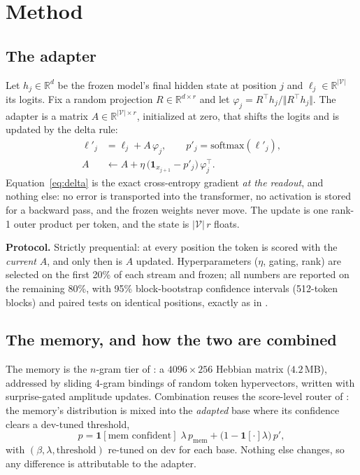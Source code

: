 \documentclass[11pt]{article}
\begin{document}
\section{Method}\label{sec:method}

\subsection{The adapter}

Let $h_j \in \mathbb{R}^{d}$ be the frozen model's final hidden state at position $j$ and $\ell_j \in \mathbb{R}^{|\mathcal{V}|}$ its logits. Fix a random projection $R \in \mathbb{R}^{d \times r}$ and let $\varphi_j = R^{\!\top}h_j / \Vert R^{\!\top}h_j\Vert$. The adapter is a matrix $A \in \mathbb{R}^{|\mathcal{V}| \times r}$, initialized at zero, that shifts the logits and is updated by the delta rule:
\begin{align}
\ell'_j &= \ell_j + A\,\varphi_j, \qquad p'_j = \mathrm{softmax}(\ell'_j),\\
A &\leftarrow A + \eta\,\big(\mathbf{1}_{x_{j+1}} - p'_j\big)\,\varphi_j^{\!\top}.
\label{eq:delta}
\end{align}
Equation~\eqref{eq:delta} is the exact cross-entropy gradient \emph{at the readout}, and nothing else: no error is transported into the transformer, no activation is stored for a backward pass, and the frozen weights never move. The update is one rank-1 outer product per token, and the state is $|\mathcal{V}|\,r$ floats.

\textbf{Protocol.} Strictly prequential: at every position the token is scored with the \emph{current} $A$, and only then is $A$ updated. Hyperparameters ($\eta$, gating, rank) are selected on the first 20\% of each stream and frozen; all numbers are reported on the remaining 80\%, with 95\% block-bootstrap confidence intervals (512-token blocks) and paired tests on identical positions, exactly as in \cite{sillage,router,hier}.

\subsection{The memory, and how the two are combined}

The memory is the $n$-gram tier of \cite{sillage}: a $4096\times256$ Hebbian matrix ($4.2$\,MB), addressed by sliding 4-gram bindings of random token hypervectors, written with surprise-gated amplitude updates. Combination reuses the score-level router of \cite{router}: the memory's distribution is mixed into the \emph{adapted} base where its confidence clears a dev-tuned threshold,
\[
p = \mathbf{1}[\text{mem confident}]\;\lambda\,p_{\mathrm{mem}} + \big(1 - \mathbf{1}[\cdot]\lambda\big)\,p',
\]
with $(\beta, \lambda, \text{threshold})$ re-tuned on dev for each base. Nothing else changes, so any difference is attributable to the adapter.
\end{document}
